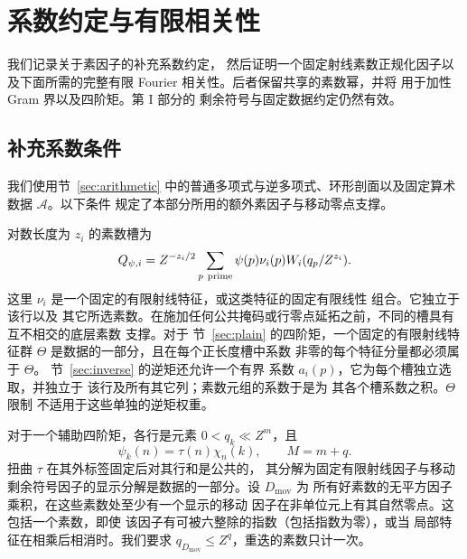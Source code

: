 \section{系数约定与有限相关性}
\label{sec:additional-arithmetic}

我们记录关于素因子的补充系数约定，
然后证明一个固定射线素数正规化因子以及下面所需的完整有限 Fourier
相关性。后者保留共享的素数幂，并将
用于加性 Gram 界以及四阶矩。第 I 部分的
剩余符号与固定数据约定仍然有效。

\subsection{补充系数条件}

我们使用节~\ref{sec:arithmetic} 中的普通多项式与逆多项式、环形剖面以及固定算术
数据 $\mathcal A$。以下条件
规定了本部分所用的额外素因子与移动零点支撑。

对数长度为 $z_i$ 的素数槽为
\begin{equation}
 Q_{\psi,i}=Z^{-z_i/2}\sum_{p\ {\rm prime}}
       \psi(p)\nu_i(p)W_i(q_p/Z^{z_i}).
 \label{old-eq:1.2}
\end{equation}
这里 $\nu_i$ 是一个固定的有限射线特征，或这类特征的固定有限线性
组合。它独立于该行以及
其它所选素数。在施加任何公共掩码或行零点延拓之前，不同的槽具有互不相交的底层素数
支撑。对于
节~\ref{sec:plain} 的四阶矩，一个固定的有限射线特征群 $\Theta$
是数据的一部分，且在每个正长度槽中系数
非零的每个特征分量都必须属于 $\Theta$。
节~\ref{sec:inverse} 的逆矩还允许一个有界
系数 $a_i(p)$，它为每个槽独立选取，并独立于
该行及所有其它列；素数元组的系数于是为
其各个槽系数之积。$\Theta$ 限制
不适用于这些单独的逆矩权重。

对于一个辅助四阶矩，各行是元素 $0<q_k\ll Z^m$，且
\begin{equation}
 \psi_k(n)=\tau(n)\chi_n(k),\qquad M=m+q.
 \label{old-eq:1.3}
\end{equation}
扭曲 $\tau$ 在其外标签固定后对其行和是公共的，
其分解为固定有限射线因子与移动
剩余符号因子的显示分解是数据的一部分。设 $D_{\mathrm{mov}}$ 为
所有好素数的无平方因子乘积，在这些素数处至少有一个显示的移动
因子在非单位元上有其自然零点。这包括一个素数，即使
该因子有可被六整除的指数（包括指数为零），或当
局部特征在相乘后相消时。我们要求
$q_{D_{\mathrm{mov}}}\le Z^q$，重迭的素数只计一次。

